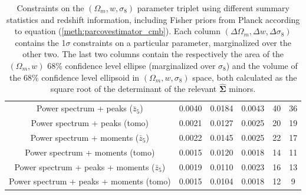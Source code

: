 \documentclass[reprint,aps,prd,superscriptaddress,showkeys,showpacs]{revtex4-1}
\newcommand{\bbh}[1]{\mathbf{\hat{#1}}}
\begin{document}
\begin{table}
\begin{tabular}{c|c|c|c|c|c|}
           Power spectrum + peaks ($\bar{z}_5$) &            0.0040 &     0.0184 &            0.0043 &                            40 &                                         36 \\
                  Power spectrum + peaks (tomo) &            0.0021 &     0.0127 &            0.0025 &                            20 &                                         19 \\
         Power spectrum + moments ($\bar{z}_5$) &            0.0022 &     0.0145 &            0.0025 &                            22 &                                         17 \\
                Power spectrum + moments (tomo) &            0.0015 &     0.0120 &            0.0018 &                            14 &                                         11 \\
 Power spectrum + peaks + moments ($\bar{z}_5$) &            0.0019 &     0.0110 &            0.0023 &                            16 &                                         13 \\
        Power spectrum + peaks + moments (tomo) &            0.0015 &     0.0104 &            0.0018 &                            12 &                                          9 \\ \hline
\bottomrule
\end{tabular}
\caption{Constraints on the $(\Omega_m,w,\sigma_8)$ parameter triplet using different summary statistics and redshift information, including Fisher priors from Planck according to equation (\ref{meth:parcovestimator_cmb}). Each column $(\Delta \Omega_m,\Delta w,\Delta \sigma_8)$ contains the 1$\sigma$ constraints on a particular parameter, marginalized over the other two. The last two columns contain the respectively the area of the $(\Omega_m,w)$ 68\% confidence level ellipse (marginalized over $\sigma_8$) and the volume of the 68\% confidence level ellipsoid in $(\Omega_m,w,\sigma_8)$ space, both calculated as the square root of the determinant of the relevant $\bbh{\Sigma}$ minors.}
\label{tbl:constraints-cmb}
\end{table}
\end{document}
